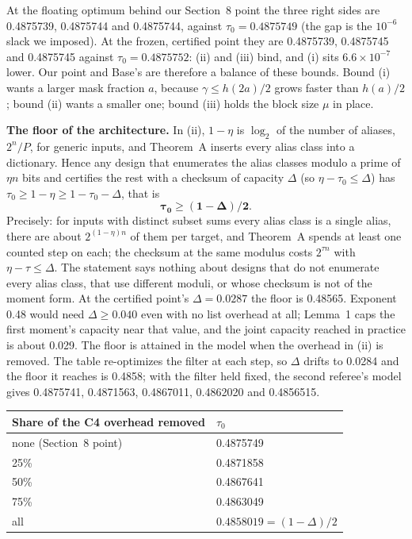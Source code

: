 \documentclass[11pt]{article}
\theoremstyle{plain}
\begin{document}
At the floating optimum behind our Section~8 point the three right sides are 0.4875739, 0.4875744 and 0.4875744, against $\tau_0 = 0.4875749$ (the gap is the $10^{-6}$ slack we imposed). At the frozen, certified point they are 0.4875739, 0.4875745 and 0.4875745 against $\tau_0 = 0.4875752$: (ii) and (iii) bind, and (i) sits $6.6\times10^{-7}$ lower. Our point and Base's are therefore a balance of these bounds. Bound (i) wants a larger mask fraction $a$, because $\gamma \le h(2a)/2$ grows faster than $h(a)/2$; bound (ii) wants a smaller one; bound (iii) holds the block size $\mu$ in place.

\textbf{The floor of the architecture.} In (ii), $1 - \eta$ is $\log_2$ of the number of aliases, $2^n/P$, for generic inputs, and Theorem~A inserts every alias class into a dictionary. Hence any design that enumerates the alias classes modulo a prime of $\eta n$ bits and certifies the rest with a checksum of capacity $\Delta$ (so $\eta - \tau_0 \le \Delta$) has $\tau_0 \ge 1 - \eta \ge 1 - \tau_0 - \Delta$, that is
\[
\boldsymbol{\tau_0 \ge (1 - \Delta)/2.}
\]
Precisely: for inputs with distinct subset sums every alias class is a single alias, there are about $2^{(1-\eta)n}$ of them per target, and Theorem~A spends at least one counted step on each; the checksum at the same modulus costs $2^{\tau n}$ with $\eta - \tau \le \Delta$. The statement says nothing about designs that do not enumerate every alias class, that use different moduli, or whose checksum is not of the moment form. At the certified point's $\Delta = 0.0287$ the floor is 0.48565. Exponent 0.48 would need $\Delta \ge 0.040$ even with no list overhead at all; Lemma~1 caps the first moment's capacity near that value, and the joint capacity reached in practice is about 0.029. The floor is attained in the model when the overhead in (ii) is removed. The table re-optimizes the filter at each step, so $\Delta$ drifts to 0.0284 and the floor it reaches is 0.4858; with the filter held fixed, the second referee's model gives 0.4875741, 0.4871563, 0.4867011, 0.4862020 and 0.4856515.

\begin{center}
\small
\begin{tabular}{ll}
\toprule
Share of the C4 overhead removed & $\tau_0$ \\
\midrule
none (Section~8 point) & 0.4875749 \\
25\% & 0.4871858 \\
50\% & 0.4867641 \\
75\% & 0.4863049 \\
all & $0.4858019 = (1 - \Delta)/2$ \\
\bottomrule
\end{tabular}
\end{center}
\end{document}
